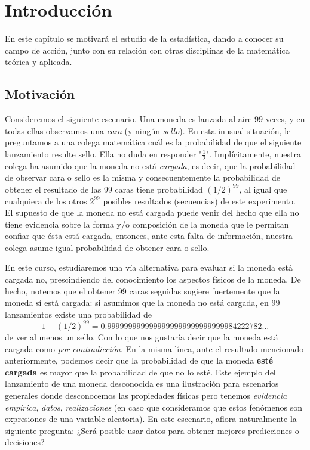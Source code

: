 

\chapter{Introducción}

En este capítulo se motivará el estudio de la estadística, dando a conocer su campo de acción, junto con su relación con otras disciplinas de la matemática teórica y aplicada. 

\section{Motivación}

Consideremos el siguiente escenario. Una moneda es lanzada al aire $99$ veces, y en todas ellas observamos una \emph{cara} (y ningún  \emph{sello}). En esta inusual situación, le preguntamos a una colega matemática cuál es la probabilidad de que el siguiente lanzamiento resulte sello. Ella no duda en responder "$\frac{1}{2}$".  Implícitamente, nuestra colega ha asumido que la moneda no está \emph{cargada}, es decir, que la probabilidad de observar cara o sello es la misma y consecuentemente la probabilidad de obtener el resultado de las 99 caras tiene probabilidad $(1/2)
^{99}$, al igual que cualquiera de los otros $2^{99}$ posibles resultados (secuencias) de este experimento. El supuesto de que la moneda no está cargada puede venir del hecho que ella no tiene evidencia sobre la forma y/o composición de la moneda que le permitan confiar que ésta está cargada, entonces, ante esta falta de información, nuestra colega asume igual probabilidad de obtener cara o sello.

En este curso, estudiaremos una vía alternativa para evaluar si la moneda está cargada no, prescindiendo del conocimiento los aspectos físicos de la moneda. De hecho, notemos que el obtener 99 caras seguidas sugiere fuertemente que la moneda sí está  cargada: si asumimos que la moneda no está cargada, en 99 lanzamientos existe una probabilidad de 
\[1-(1/2)
^{99} = 0.9999999999999999999999999999984222782\ldots\]
de ver al menos un sello. Con lo que nos gustaría decir que la moneda está cargada como \emph{por contradicción}. En la misma línea, ante el resultado mencionado anteriormente, podemos decir que la probabilidad de que la moneda \textbf{esté cargada} es mayor que la probabilidad de que no lo esté. Este ejemplo del lanzamiento de una moneda desconocida es una ilustración para escenarios generales donde desconocemos las propiedades físicas pero tenemos \emph{evidencia empírica}, \emph{datos}, \emph{realizaciones} (en caso que consideramos que estos fenómenos son expresiones de una variable aleatoria). En este escenario, aflora naturalmente la siguiente pregunta: ¿Será posible usar datos para obtener mejores predicciones o decisiones?

